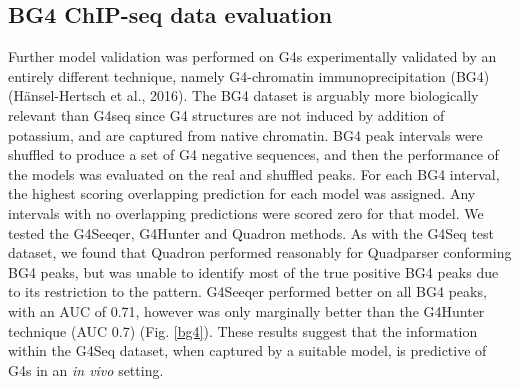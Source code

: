\documentclass[12pt,a4paper,]{report}
\let\origfigure=\figure
\let\endorigfigure=\endfigure
\renewenvironment{figure}[1][2] {
    \expandafter\origfigure\expandafter[H]
} {
    \endorigfigure
}
\begin{document}
\begin{figure}[htbp]
\caption[Validation curves for G4Seeqer method]{\textbf{Validation   curves   for   G4Seeqer   method}   \textbf{a)}   Receiver   Operator   Characteristic   (ROC)   curve   showing   the   performance   of   G4Seeqer,   Multi-Layer   Perceptron   (MLP)   trained   on   trinucleotide   contents,   Quadron,   a   Gradient   Boosted   Machine   model   (Sahakyan   et   al. 2017)   and   the   G4Hunter   method   (Bedrat   et   al. 2016),   on   a   held   out   test   set   of   the   G4Seq   dataset   (10\%   of   total   dataset).   \textbf{b)}   Precision-recall   curves   showing   the   performance   of   G4Seeqer,   trinucleotide   MLP,   Quadron,   and   G4Hunter   on   the   same   dataset.   \textbf{c)}   ROC   curve   and   \textbf{d)}   Precision   Recall   curve   showing   the   performance   on   sequences   from   the   test   set   conforming   to   the   Quadparser   motif.   \label{roc}}
\end{figure}

\newpage

\hypertarget{bg4-chip-seq-data-evaluation}{%
\subsection{BG4 ChIP-seq data
evaluation}\label{bg4-chip-seq-data-evaluation}}

Further model validation was performed on G4s experimentally validated
by an entirely different technique, namely G4-chromatin
immunoprecipitation (BG4) (Hänsel-Hertsch et al., 2016). The BG4 dataset
is arguably more biologically relevant than G4seq since G4 structures
are not induced by addition of potassium, and are captured from native
chromatin. BG4 peak intervals were shuffled to produce a set of G4
negative sequences, and then the performance of the models was evaluated
on the real and shuffled peaks. For each BG4 interval, the highest
scoring overlapping prediction for each model was assigned. Any
intervals with no overlapping predictions were scored zero for that
model. We tested the G4Seeqer, G4Hunter and Quadron methods. As with the
G4Seq test dataset, we found that Quadron performed reasonably for
Quadparser conforming BG4 peaks, but was unable to identify most of the
true positive BG4 peaks due to its restriction to the pattern. G4Seeqer
performed better on all BG4 peaks, with an AUC of 0.71, however was only
marginally better than the G4Hunter technique (AUC 0.7) (Fig.
\ref{bg4}). These results suggest that the information within the G4Seq
dataset, when captured by a suitable model, is predictive of G4s in an
\emph{in vivo} setting.
\end{document}
